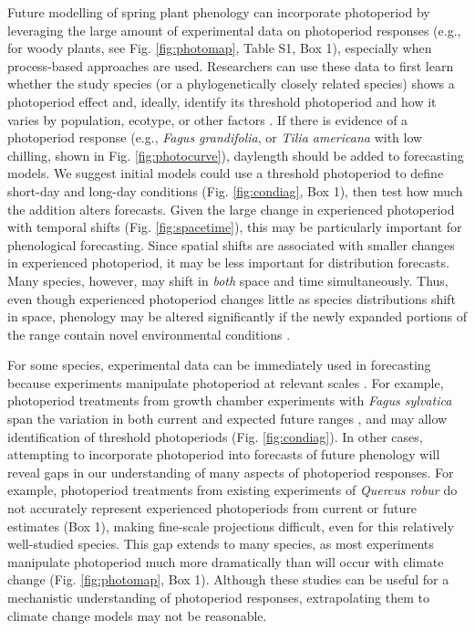 \documentclass{article}
\begin{document}
\par Future modelling of spring plant phenology can incorporate photoperiod by leveraging the large amount of experimental data on photoperiod responses (e.g., for woody plants, see Fig. \ref{fig:photomap}, Table S1, Box 1), especially when process-based approaches are used. Researchers can use these data to first learn whether the study species (or a phylogenetically closely related species) shows a photoperiod effect and, ideally, identify its threshold photoperiod and how it varies by population, ecotype, or other factors \citep{tobin2008,bradshaw2006}. If there is evidence of a photoperiod response (e.g., \emph{Fagus grandifolia}, or \emph{Tilia americana} with low chilling, shown in Fig. \ref{fig:photocurve}), daylength should be added to forecasting models. We suggest initial models could use a threshold photoperiod to define short-day and long-day conditions (Fig. \ref{fig:condiag}, Box 1), then test how much the addition alters forecasts. Given the large change in experienced photoperiod with temporal shifts (Fig. \ref{fig:spacetime}), this may be particularly important for phenological forecasting. Since spatial shifts are associated with smaller changes in experienced photoperiod, it may be less important for distribution forecasts. Many species, however, may shift in \emph{both} space and time simultaneously. Thus, even though experienced photoperiod changes little as species distributions shift in space, phenology may be altered significantly if the newly expanded portions of the range contain novel environmental conditions \citep[e.g., ][]{martin2014}.

\par For some species, experimental data can be immediately used in forecasting because experiments manipulate photoperiod at relevant scales \citep[e.g., ][Fig. \ref{fig:photomap}, Box 1, Table S1]{Heide:2015aa,Basler:2014aa}. For example, photoperiod treatments from growth chamber experiments with \emph{Fagus sylvatica} span the variation in both current and expected future ranges \citep[Box 1, ][]{duputie2015}, and may allow identification of threshold photoperiods (Fig. \ref{fig:condiag}). In other cases, attempting to incorporate photoperiod into forecasts of future phenology will reveal gaps in our understanding of many aspects of photoperiod responses. For example, photoperiod treatments from existing experiments of \emph{Quercus robur} do not accurately represent experienced photoperiods from current or future estimates (Box 1), making fine-scale projections difficult, even for this relatively well-studied species. This gap extends to many species, as most experiments manipulate photoperiod much more dramatically than will occur with climate change (Fig. \ref{fig:photomap}, Box 1). Although these studies can be useful for a mechanistic understanding of photoperiod responses, extrapolating them to climate change models may not be reasonable. 
 
\end{document}
